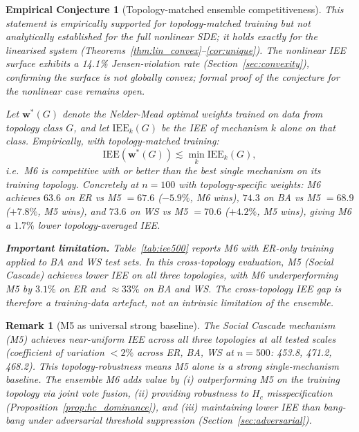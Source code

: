 \documentclass[review,12pt]{elsarticle}
\newcommand{\bfw}{\mathbf{w}}
\newcommand{\IEE}{\mathrm{IEE}}
\newcommand{\Hc}{H_c}
\newtheorem{conjecture}{Empirical Conjecture}
\newtheorem{remark}{Remark}
\begin{document}
\begin{conjecture}[Topology-matched ensemble competitiveness]
\label{prop:dominance}
\emph{This statement is empirically supported for topology-matched training
but not analytically established for the full nonlinear SDE; it holds exactly
for the linearised system (Theorems~\ref{thm:lin_convex}--\ref{cor:unique}).
The nonlinear IEE surface exhibits a 14.1\% Jensen-violation rate
(Section~\ref{sec:convexity}), confirming the surface is not globally
convex; formal proof of the conjecture for the nonlinear case remains open.}

Let $\bfw^*(G)$ denote the Nelder-Mead optimal weights \emph{trained on data
from topology class $G$}, and let $\IEE_k(G)$ be the IEE of mechanism $k$
alone on that class.  Empirically, with topology-matched training:
\begin{equation}
  \IEE(\bfw^*(G)) \lesssim \min_k \IEE_k(G),
\end{equation}
i.e.\ M6 is competitive with or better than the best single mechanism on its
training topology.  Concretely at $n=100$ with topology-specific weights:
M6 achieves $63.6$ on ER vs M5 $=67.6$ ($-5.9\%$, M6 wins), $74.3$ on BA
vs M5 $=68.9$ ($+7.8\%$, M5 wins), and $73.6$ on WS vs M5 $=70.6$
($+4.2\%$, M5 wins), giving M6 a $1.7\%$ lower topology-averaged IEE.

\textbf{Important limitation.}  Table~\ref{tab:iee500} reports M6 with
\emph{ER-only} training applied to BA and WS test sets.  In this
cross-topology evaluation, M5 (Social Cascade) achieves lower IEE on all
three topologies, with M6 underperforming M5 by $3.1\%$ on ER and $\approx
33\%$ on BA and WS.  The cross-topology IEE gap is therefore a training-data
artefact, not an intrinsic limitation of the ensemble.
\end{conjecture}

\begin{remark}[M5 as universal strong baseline]
\label{rem:m5_baseline}
The Social Cascade mechanism (M5) achieves near-uniform IEE across all three
topologies at all tested scales (coefficient of variation $< 2\%$ across ER,
BA, WS at $n=500$: 453.8, 471.2, 468.2).  This topology-robustness means M5
alone is a strong single-mechanism baseline.  The ensemble M6 adds value
by (i) outperforming M5 on the training topology via joint vote fusion,
(ii) providing robustness to $\Hc$ misspecification
(Proposition~\ref{prop:hc_dominance}), and
(iii) maintaining lower IEE than bang-bang under adversarial threshold
suppression (Section~\ref{sec:adversarial}).
\end{remark}
\end{document}
